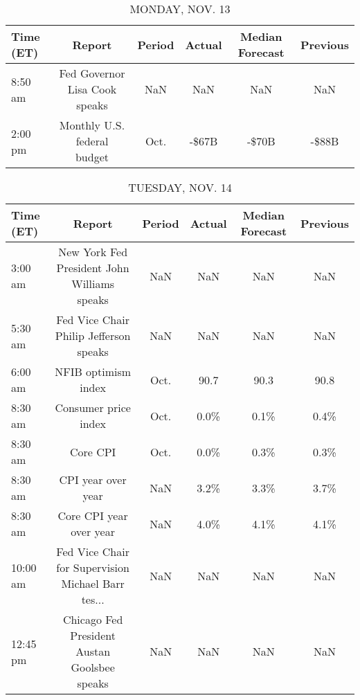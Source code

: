 \documentclass{article}%
\begin{document}
%
\normalsize%


\begin{table}[htbp]%
\caption{MONDAY, NOV. 13}%
\centering%
\begin{adjustbox}{width=1\textwidth}%
\begin{tabular}{lccccc}
\toprule
Time (ET) &                        Report & Period & Actual & Median Forecast & Previous \\
\midrule
  8:50 am & Fed Governor Lisa Cook speaks &    NaN &    NaN &             NaN &      NaN \\
  2:00 pm &   Monthly U.S. federal budget &   Oct. &  -\$67B &           -\$70B &    -\$88B \\
\bottomrule
\end{tabular}
%
\end{adjustbox}%
\end{table}

%


\begin{table}[htbp]%
\caption{TUESDAY, NOV. 14}%
\centering%
\begin{adjustbox}{width=1\textwidth}%
\begin{tabular}{lccccc}
\toprule
Time (ET) &                                             Report & Period & Actual & Median Forecast & Previous \\
\midrule
  3:00 am &        New York Fed President John Williams speaks &    NaN &    NaN &             NaN &      NaN \\
  5:30 am &             Fed Vice Chair Philip Jefferson speaks &    NaN &    NaN &             NaN &      NaN \\
  6:00 am &                                NFIB optimism index &   Oct. &   90.7 &            90.3 &     90.8 \\
  8:30 am &                               Consumer price index &   Oct. &   0.0\% &            0.1\% &     0.4\% \\
  8:30 am &                                           Core CPI &   Oct. &   0.0\% &            0.3\% &     0.3\% \\
  8:30 am &                                 CPI year over year &    NaN &   3.2\% &            3.3\% &     3.7\% \\
  8:30 am &                            Core CPI year over year &    NaN &   4.0\% &            4.1\% &     4.1\% \\
 10:00 am & Fed Vice Chair for Supervision Michael Barr tes... &    NaN &    NaN &             NaN &      NaN \\
 12:45 pm &       Chicago Fed President Austan Goolsbee speaks &    NaN &    NaN &             NaN &      NaN \\
\bottomrule
\end{tabular}
%
\end{adjustbox}%
\end{table}
\end{document}
